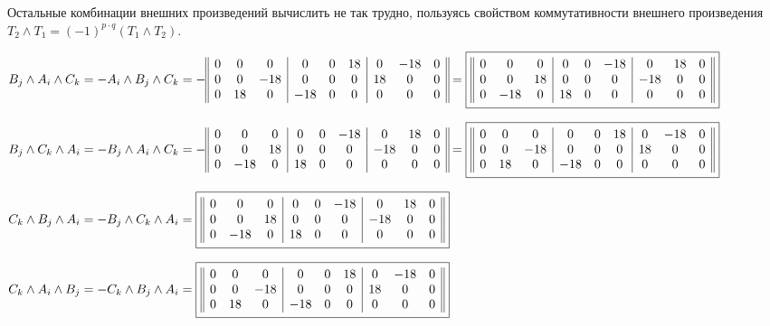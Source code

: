 \documentclass{article}
\newcommand*\squared[1]{\tikz[baseline=(char.base)]{
            \node[shape=rectangle,draw,inner sep=4pt] (char) {#1};}}
\begin{document}
\noindent Остальные комбинации внешних произведений вычислить не так трудно, пользуясь свойством коммутативности внешнего произведения $T_2\wedge T_1 = (-1)^{p\cdot q}(T_1\wedge T_2)$.
\begin{center}
$B_j \wedge A_i \wedge C_k = -A_i \wedge B_j \wedge C_k = - \begin{array}{||ccc|ccc|ccc||}
0 & 0 & 0 & 0 & 0 & 18 & 0 & -18 & 0 \\
0 & 0 & -18 & 0 & 0 & 0 & 18 & 0 & 0 \\
0 & 18 & 0 & -18 & 0 & 0 & 0 & 0 & 0
\end{array} = \squared{$\begin{array}{||ccc|ccc|ccc||}
0 & 0 & 0 & 0 & 0 & -18 & 0 & 18 & 0 \\
0 & 0 & 18 & 0 & 0 & 0 & -18 & 0 & 0 \\
0 & -18 & 0 & 18 & 0 & 0 & 0 & 0 & 0
\end{array}$}$
\end{center}
\begin{center}
$B_j \wedge C_k \wedge A_i = -B_j \wedge A_i \wedge C_k = - \begin{array}{||ccc|ccc|ccc||}
0 & 0 & 0 & 0 & 0 & -18 & 0 & 18 & 0 \\
0 & 0 & 18 & 0 & 0 & 0 & -18 & 0 & 0 \\
0 & -18 & 0 & 18 & 0 & 0 & 0 & 0 & 0
\end{array} = \squared{$\begin{array}{||ccc|ccc|ccc||}
0 & 0 & 0 & 0 & 0 & 18 & 0 & -18 & 0 \\
0 & 0 & -18 & 0 & 0 & 0 & 18 & 0 & 0 \\
0 & 18 & 0 & -18 & 0 & 0 & 0 & 0 & 0
\end{array}$}$
\end{center}
\begin{center}
$C_k \wedge B_j \wedge A_i = - B_j \wedge C_k \wedge A_i = \squared{$\begin{array}{||ccc|ccc|ccc||}
0 & 0 & 0 & 0 & 0 & -18 & 0 & 18 & 0 \\
0 & 0 & 18 & 0 & 0 & 0 & -18 & 0 & 0 \\
0 & -18 & 0 & 18 & 0 & 0 & 0 & 0 & 0
\end{array}$}$
\end{center}
\begin{center}
$C_k \wedge A_i \wedge B_j = - C_k \wedge B_j \wedge A_i = \squared{$\begin{array}{||ccc|ccc|ccc||}
0 & 0 & 0 & 0 & 0 & 18 & 0 & -18 & 0 \\
0 & 0 & -18 & 0 & 0 & 0 & 18 & 0 & 0 \\
0 & 18 & 0 & -18 & 0 & 0 & 0 & 0 & 0
\end{array}$}$
\end{center}
\end{document}
